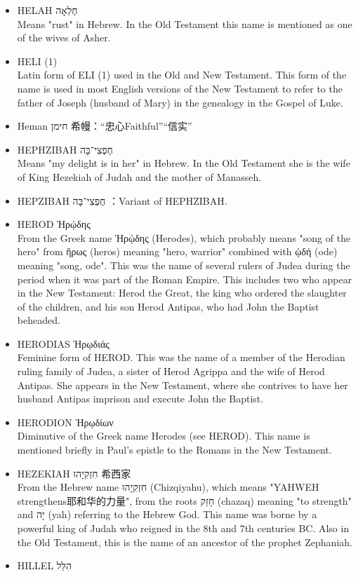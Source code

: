 \begin{itemize}
\item HELAH חֶלְאָה\\
Means "rust" in Hebrew. In the Old Testament this name is mentioned as one of the wives of Asher.
\item HELI (1) \\
Latin form of ELI (1) used in the Old and New Testament. This form of the name is used in most English versions of the New Testament to refer to the father of Joseph (husband of Mary) in the genealogy in the Gospel of Luke.
\item Heman חימן 希幔：“忠心Faithful”“信实”
\item HEPHZIBAH חֶפְצִי־בָּה \\
Means "my delight is in her" in Hebrew. In the Old Testament she is the wife of King Hezekiah of Judah and the mother of Manasseh.
\item HEPZIBAH חֶפְצִי־בָּה ：Variant of HEPHZIBAH.
\item HEROD Ἡρῴδης \\
From the Greek name Ἡρῴδης (Herodes), which probably means "song of the hero" from ἥρως (heros) meaning "hero, warrior" combined with ᾠδή (ode) meaning "song, ode". This was the name of several rulers of Judea during the period when it was part of the Roman Empire. This includes two who appear in the New Testament: Herod the Great, the king who ordered the slaughter of the children, and his son Herod Antipas, who had John the Baptist beheaded.
\item HERODIAS Ἡρῳδιάς \\
Feminine form of HEROD. This was the name of a member of the Herodian ruling family of Judea, a sister of Herod Agrippa and the wife of Herod Antipas. She appears in the New Testament, where she contrives to have her husband Antipas imprison and execute John the Baptist.
\item HERODION Ἡρῳδίων \\
Diminutive of the Greek name Herodes (see HEROD). This name is mentioned briefly in Paul's epistle to the Romans in the New Testament.
\item HEZEKIAH חִזְקִיָהוּ 希西家\\
From the Hebrew name חִזְקִיָהוּ (Chizqiyahu), which means "YAHWEH strengthens耶和华的力量", from the roots חָזַק (chazaq) meaning "to strength" and יָה (yah) referring to the Hebrew God. This name was borne by a powerful king of Judah who reigned in the 8th and 7th centuries BC. Also in the Old Testament, this is the name of an ancestor of the prophet Zephaniah.
\item HILLEL הִלֵּל \\

\end{itemize}
